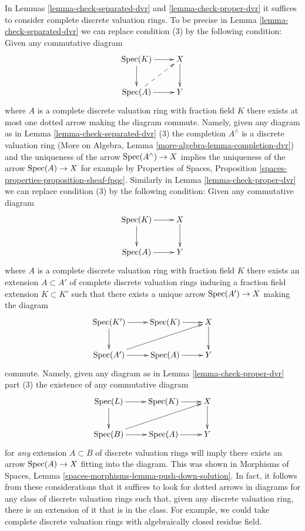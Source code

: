 \begin{remark}
\label{remark-variant}
In Lemmas \ref{lemma-check-separated-dvr} and \ref{lemma-check-proper-dvr}
it suffices to consider complete discrete valuation rings.
To be precise in Lemma \ref{lemma-check-separated-dvr} we can replace
condition (3) by the following condition: Given any commutative diagram
$$
\xymatrix{
\Spec(K) \ar[r] \ar[d] & X \ar[d] \\
\Spec(A) \ar[r] \ar@{-->}[ru] & Y
}
$$
where $A$ is a complete discrete valuation ring with fraction field $K$
there exists at most one dotted arrow making the diagram commute. Namely, given
any diagram as in Lemma \ref{lemma-check-separated-dvr} (3)
the completion $A^\wedge$ is a discrete valuation ring
(More on Algebra, Lemma \ref{more-algebra-lemma-completion-dvr})
and the uniqueness of the arrow $\mathop{\mathrm{Spec}}(A^\wedge) \to X$
implies the uniqueness of the arrow $\mathop{\mathrm{Spec}}(A) \to X$
for example by Properties of Spaces, Proposition
\ref{spaces-properties-proposition-sheaf-fpqc}.
Similarly in Lemma \ref{lemma-check-proper-dvr}
we can replace condition (3) by the following condition:
Given any commutative diagram
$$
\xymatrix{
\Spec(K) \ar[r] \ar[d] & X \ar[d] \\
\Spec(A) \ar[r] & Y
}
$$
where $A$ is a complete discrete valuation ring with fraction field $K$
there exists an extension $A \subset A'$ of complete discrete valuation rings
inducing a fraction field extension $K \subset K'$ such that there exists a
unique arrow $\mathop{\mathrm{Spec}}(A') \to X$ making the diagram
$$
\xymatrix{
\Spec(K') \ar[r] \ar[d] & \Spec(K) \ar[r] & X \ar[d] \\
\Spec(A') \ar[r] \ar[rru] & \Spec(A) \ar[r] & Y
}
$$
commute. Namely, given any diagram as in Lemma \ref{lemma-check-proper-dvr}
part (3) the existence of any commutative diagram
$$
\xymatrix{
\Spec(L) \ar[r] \ar[d] & \Spec(K) \ar[r] & X \ar[d] \\
\Spec(B) \ar[r] \ar[rru] & \Spec(A) \ar[r] & Y
}
$$
for {\it any} extension $A \subset B$ of discrete valuation rings
will imply there exists an arrow $\mathop{\mathrm{Spec}}(A) \to X$ fitting into
the diagram. This was shown in
Morphisms of Spaces, Lemma \ref{spaces-morphisms-lemma-push-down-solution}.
In fact, it follows from these considerations that it suffices to look
for dotted arrows in diagrams for any class of discrete valuation rings
such that, given any discrete valuation ring, there is an extension of it
that is in the class. For example, we could take complete discrete valuation
rings with algebraically closed residue field.
\end{remark}








